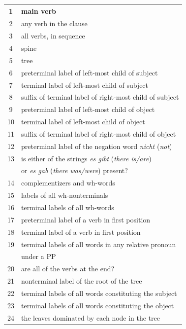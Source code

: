 \documentclass[10pt]{report}
\theoremstyle{plain}
\begin{document}
{\begin{table}[!h]
\begin{center}
\begin{small}
\begin{tabular}{|c|l|}
\hline
1 & main verb \\
\hline
2 & any verb in the clause \\
\hline
3 & all verbs, in sequence \\
\hline
4 & spine \\
\hline
5 & tree \\
\hline
6 & preterminal label  of left-most child of subject \\
\hline
7 & terminal label of left-most child of subject \\
\hline
8 & suffix of terminal label of right-most child of subject \\
\hline
9 & preterminal label  of left-most child of object \\
\hline
10 & terminal label of left-most child of object \\
\hline
11 & suffix of terminal label of right-most child of object \\
\hline
12 & preterminal label of the negation word {\em nicht} ({\em not}) \\
\hline
13 & is either of the strings {\em es gibt} ({\em there is/are})\\
& or {\em es gab} ({\em there was/were}) present? \\
\hline
14 & complementizers and wh-words \\
\hline
15 & labels of all wh-nonterminals \\
\hline
16 & terminal labels of all wh-words \\
\hline
17 & preterminal label of a verb in first position \\
\hline
18 & terminal label of a verb in first position \\
\hline
19 & terminal labels of all words in any relative pronoun\\
&  under a PP \\
\hline
20 & are all of the verbs at the end? \\
\hline
21 & nonterminal label of the root of the tree \\
\hline
22 & terminal labels of all words constituting the subject \\
\hline
23 & terminal labels of all words constituting the object \\
\hline
24 & the leaves dominated by each node in the tree \\

\end{tabular}
\end{small}
\end{center}
\end{table}}
\end{document}
